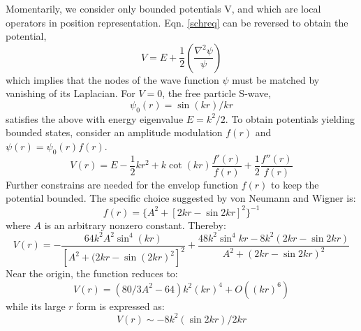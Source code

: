 \documentclass[landscape,a0paper,fontscale=0.31]{baposter} %
\begin{document}
\begin{poster}
{Momentarily, we consider only bounded potentials V, and which are local operators in position representation. Eqn. \ref{schreq} can be reversed to obtain the potential,
\begin{equation}
V = E + \frac{1}{2} \left( \frac{\nabla^2 \psi}{\psi} \right)
\end{equation}
which implies that the nodes of the wave function $\psi$ must be matched by vanishing of its Laplacian.
For $V=0$, the free particle S-wave,
\begin{equation}
\psi_0 (r) = \sin{(kr)}/kr
\end{equation}
satisfies the above with energy eigenvalue $E = k^2/2$. To obtain potentials yielding bounded states, consider an amplitude modulation $f(r)$ and $\psi(r) = \psi_0 (r) f(r)$.
\begin{equation}
V(r) = E - \frac{1}{2}k r^2 + k \cot(kr) \frac{f'(r)}{f(r)} + \frac{1}{2}\frac{f''(r)}{f(r)}
\end{equation}
Further constrains are needed for the envelop function $f(r)$ to keep the potential bounded. The specific choice suggested by von Neumann and Wigner \cite{ref2} is:
\begin{equation}
f(r) = \{ A^2 + [ 2kr - \sin{2kr} ]^2 \}^{-1}
\end{equation}
where $A$ is an arbitrary nonzero constant. Thereby:
\begin{dmath}
V(r) = - \frac{64 k^2 A^2 \sin^4 (kr)}{[A^2 + (2kr - \sin (2kr)^2]^2} + \frac{48 k^2 \sin ^4 kr - 8k^2 (2kr - \sin 2kr)}{A^2 + (2kr - \sin 2kr)^2 }
\label{potential}
\end{dmath}
Near the origin, the function reduces to:
\begin{equation}
V(r) = (80/3A^2 -64)k^2 (kr)^4 + O((kr)^6)
\end{equation}
while its large $r$ form is expressed as:
\begin{equation}
V(r) \sim -8k^2 (\sin 2kr)/2kr
\end{equation}

}


\end{poster}
\end{document}
